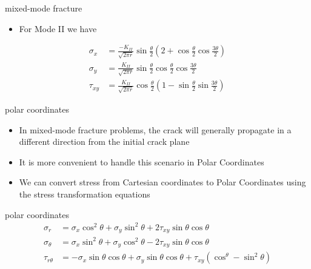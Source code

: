 \documentclass[
  letterpaper,
  ignorenonframetext,
  aspectratio=43,
  handout,
  12pt]{beamer}
\providecommand{\tightlist}{%
  \setlength{\itemsep}{0pt}\setlength{\parskip}{0pt}}
\providecommand{\tightlist}{%
\setlength{\itemsep}{0pt}\setlength{\parskip}{0pt}}
\begin{document}
\begin{frame}{mixed-mode fracture}
\protect\hypertarget{mixed-mode-fracture-2}{}
\begin{itemize}
\tightlist
\item
  For Mode II we have
\end{itemize}

\[\begin{aligned}
  \sigma_x &= \frac{-K_{II}}{\sqrt{2\pi r}} \sin \frac{\theta}{2} \left(2+\cos \frac{\theta}{2}\cos \frac{3\theta}{2}\right)\\
  \sigma_y &= \frac{K_{II}}{\sqrt{2\pi r}} \sin \frac{\theta}{2} \cos \frac{\theta}{2}\cos \frac{3\theta}{2}\\
  \tau_{xy} &= \frac{K_{II}}{\sqrt{2\pi r}} \cos \frac{\theta}{2} \left(1-\sin \frac{\theta}{2}\sin \frac{3\theta}{2}\right)
\end{aligned}\]
\end{frame}

\begin{frame}{polar coordinates}
\protect\hypertarget{polar-coordinates}{}
\begin{itemize}
\tightlist
\item
  In mixed-mode fracture problems, the crack will generally propagate in
  a different direction from the initial crack plane
\item
  It is more convenient to handle this scenario in Polar Coordinates
\item
  We can convert stress from Cartesian coordinates to Polar Coordinates
  using the stress transformation equations
\end{itemize}
\end{frame}

\begin{frame}{polar coordinates}
\protect\hypertarget{polar-coordinates-1}{}
\[\begin{aligned}
  \sigma_r &= \sigma_x \cos^2 \theta + \sigma_y \sin^2 \theta + 2\tau_{xy} \sin \theta \cos \theta\\
  \sigma_\theta &= \sigma_x \sin^2 \theta + \sigma_y \cos^2 \theta - 2\tau_{xy} \sin \theta \cos \theta\\
  \tau_{r\theta} &= -\sigma_x \sin \theta \cos \theta + \sigma_y \sin \theta \cos \theta + \tau_{xy} (\cos^\theta - \sin^2 \theta)
\end{aligned}\]
\end{frame}
\end{document}
